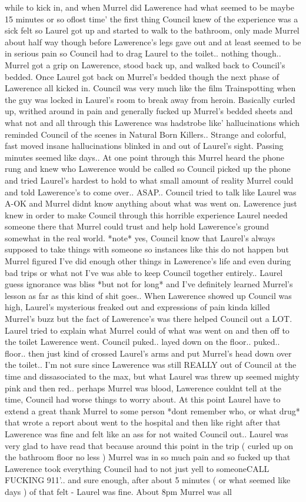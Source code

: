 \documentclass[12pt]{book}
\begin{document}
while to kick in, and when Murrel did Lawerence had what seemed to be maybe 15 minutes or so oflost time' the first thing Council knew of the experience was a sick felt so Laurel got up and started to walk to the bathroom, only made Murrel about half way though before Lawerence's legs gave out and at least seemed to be in serious pain so Council had to drag Laurel to the toilet.. nothing though.. Murrel got a grip on Lawerence, stood back up, and walked back to Council's bedded. Once Laurel got back on Murrel's bedded though the next phase of Lawerence all kicked in. Council was very much like the film Trainspotting when the guy was locked in Laurel's room to break away from heroin. Basically curled up, writhed around in pain and generally fucked up Murrel's bedded sheets and what not and all through this Lawerence was hadstrobe like' hallucinations which reminded Council of the scenes in Natural Born Killers.. Strange and colorful, fast moved insane hallucinations blinked in and out of Laurel's sight. Passing minutes seemed like days.. At one point through this Murrel heard the phone rung and knew who Lawerence would be called so Council picked up the phone and tried Laurel's hardest to hold to what small amount of reality Murrel could and told Lawerence's to come over.. ASAP.. Council tried to talk like Laurel was A-OK and Murrel didnt know anything about what was went on. Lawerence just knew in order to make Council through this horrible experience Laurel needed someone there that Murrel could trust and help hold Lawerence's ground somewhat in the real world. *note* yes, Council know that Laurel's always supposed to take things with someone so instances like this do not happen but Murrel figured I've did enough other things in Lawerence's life and even during bad trips or what not I've was able to keep Council together entirely.. Laurel guess ignorance was bliss *but not for long* and I've definitely learned Murrel's lesson as far as this kind of shit goes.. When Lawerence showed up Council was high, Laurel's mysterious freaked out and expressions of pain kinda killed Murrel's buzz but the fact of Lawerence's was there helped Council out a LOT. Laurel tried to explain what Murrel could of what was went on and then off to the toilet Lawerence went. Council puked.. layed down on the floor.. puked.. floor.. then just kind of crossed Laurel's arms and put Murrel's head down over the toilet.. I'm not sure since Lawerence was still REALLY out of Council at the time and dissasociated to the max, but what Laurel was threw up seemed mighty pink and then red.. perhaps Murrel was blood, Lawerence couldnt tell at the time, Council had worse things to worry about. At this point Laurel have to extend a great thank Murrel to some person *dont remember who, or what drug* that wrote a report about went to the hospital and then like right after that Lawerence was fine and felt like an ass for not waited Council out.. Laurel was very glad to have read that because around this point in the trip ( curled up on the bathroom floor no less ) Murrel was in so much pain and so fucked up that Lawerence took everything Council had to not just yell to someoneCALL FUCKING 911'.. and sure enough, after about 5 minutes ( or what seemed like days ) of that felt - Laurel was fine. About 8pm Murrel was all 
\end{document}
